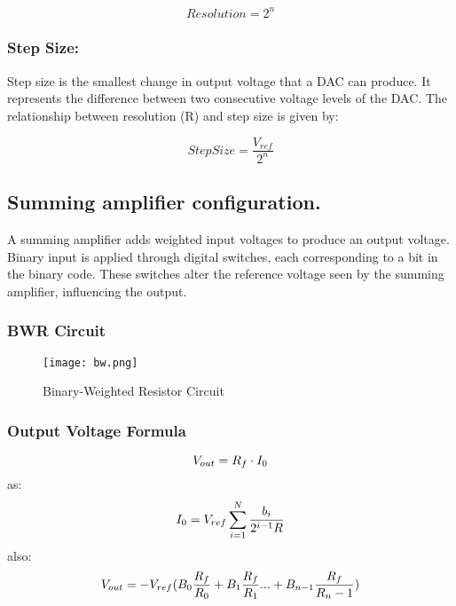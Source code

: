 \documentclass{article}
\begin{document}
\begin{equation}
Resolution = 2^n
\end{equation}
\subsubsection{Step Size:}

Step size is the smallest change in output voltage that a DAC can produce.
It represents the difference between two consecutive voltage levels of the DAC.
The relationship between resolution (R) and step size 
is given by: 

\begin{equation}
Step Size = \frac{V_{ref}}{2^n}
\end{equation}
\newpage

\subsection{\textbf{Summing amplifier configuration.}}
A summing amplifier adds weighted input voltages to produce an output voltage.
Binary input is applied through digital switches, each corresponding to a bit in the binary code.
These switches alter the reference voltage seen by the summing amplifier, influencing the output.
\subsubsection{BWR Circuit}

\begin{figure}[htbp]
    \centering
    \texttt{[image: bw.png]}
    \caption{Binary-Weighted Resistor Circuit}
    \label{fig:enter-label}
\end{figure}
\subsubsection{Output Voltage Formula}


\begin{equation}
\fontsize{10}{6}\selectfont
V_{out} = R_f\cdot I_0
\end{equation}
as: 
\begin{equation}
\fontsize{10}{6}\selectfont
I_0 = V_{ref} \sum_{i=1}^N \frac{b_i}{2^{i-1} R}
\end{equation}
also: 
\begin{equation}
\fontsize{10}{6}\selectfont
V_{out} = - V_{ref}(B_0 \frac{R_f}{R_0} + B_1 \frac{R_f}{R_1} ... + B_{n-1} \frac{R_f}{R_n-1})
\end{equation}
\end{document}
